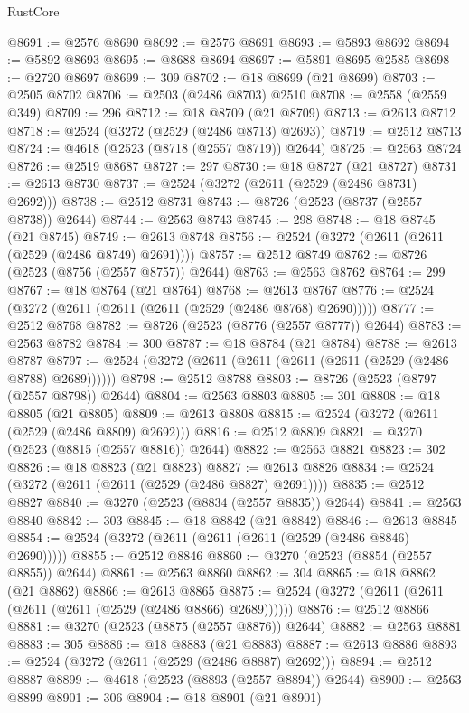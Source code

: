 \begin{lexlean}{RustCore}
\begin{coremodule}
@8691 := @2576 @8690
@8692 := @2576 @8691
@8693 := @5893 @8692
@8694 := @5892 @8693
@8695 := @8688 @8694
@8697 := @5891 @8695 @2585
@8698 := @2720 @8697
@8699 := 309
@8702 := @18 @8699 (@21 @8699)
@8703 := @2505 @8702
@8706 := @2503 (@2486 @8703) @2510
@8708 := @2558 (@2559 @349)
@8709 := 296
@8712 := @18 @8709 (@21 @8709)
@8713 := @2613 @8712
@8718 := @2524 (@3272 (@2529 (@2486 @8713) @2693))
@8719 := @2512 @8713
@8724 := @4618 (@2523 (@8718 (@2557 @8719)) @2644)
@8725 := @2563 @8724
@8726 := @2519 @8687
@8727 := 297
@8730 := @18 @8727 (@21 @8727)
@8731 := @2613 @8730
@8737 := @2524 (@3272 (@2611 (@2529 (@2486 @8731) @2692)))
@8738 := @2512 @8731
@8743 := @8726 (@2523 (@8737 (@2557 @8738)) @2644)
@8744 := @2563 @8743
@8745 := 298
@8748 := @18 @8745 (@21 @8745)
@8749 := @2613 @8748
@8756 := @2524 (@3272 (@2611 (@2611 (@2529 (@2486 @8749) @2691))))
@8757 := @2512 @8749
@8762 := @8726 (@2523 (@8756 (@2557 @8757)) @2644)
@8763 := @2563 @8762
@8764 := 299
@8767 := @18 @8764 (@21 @8764)
@8768 := @2613 @8767
@8776 := @2524 (@3272 (@2611 (@2611 (@2611 (@2529 (@2486 @8768) @2690)))))
@8777 := @2512 @8768
@8782 := @8726 (@2523 (@8776 (@2557 @8777)) @2644)
@8783 := @2563 @8782
@8784 := 300
@8787 := @18 @8784 (@21 @8784)
@8788 := @2613 @8787
@8797 := @2524 (@3272 (@2611 (@2611 (@2611 (@2611 (@2529 (@2486 @8788) @2689))))))
@8798 := @2512 @8788
@8803 := @8726 (@2523 (@8797 (@2557 @8798)) @2644)
@8804 := @2563 @8803
@8805 := 301
@8808 := @18 @8805 (@21 @8805)
@8809 := @2613 @8808
@8815 := @2524 (@3272 (@2611 (@2529 (@2486 @8809) @2692)))
@8816 := @2512 @8809
@8821 := @3270 (@2523 (@8815 (@2557 @8816)) @2644)
@8822 := @2563 @8821
@8823 := 302
@8826 := @18 @8823 (@21 @8823)
@8827 := @2613 @8826
@8834 := @2524 (@3272 (@2611 (@2611 (@2529 (@2486 @8827) @2691))))
@8835 := @2512 @8827
@8840 := @3270 (@2523 (@8834 (@2557 @8835)) @2644)
@8841 := @2563 @8840
@8842 := 303
@8845 := @18 @8842 (@21 @8842)
@8846 := @2613 @8845
@8854 := @2524 (@3272 (@2611 (@2611 (@2611 (@2529 (@2486 @8846) @2690)))))
@8855 := @2512 @8846
@8860 := @3270 (@2523 (@8854 (@2557 @8855)) @2644)
@8861 := @2563 @8860
@8862 := 304
@8865 := @18 @8862 (@21 @8862)
@8866 := @2613 @8865
@8875 := @2524 (@3272 (@2611 (@2611 (@2611 (@2611 (@2529 (@2486 @8866) @2689))))))
@8876 := @2512 @8866
@8881 := @3270 (@2523 (@8875 (@2557 @8876)) @2644)
@8882 := @2563 @8881
@8883 := 305
@8886 := @18 @8883 (@21 @8883)
@8887 := @2613 @8886
@8893 := @2524 (@3272 (@2611 (@2529 (@2486 @8887) @2692)))
@8894 := @2512 @8887
@8899 := @4618 (@2523 (@8893 (@2557 @8894)) @2644)
@8900 := @2563 @8899
@8901 := 306
@8904 := @18 @8901 (@21 @8901)

\end{coremodule}
\end{lexlean}
